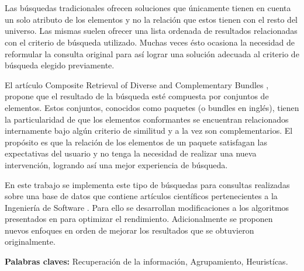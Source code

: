 \chapter*{\runtitulo}

\noindent Las búsquedas tradicionales ofrecen soluciones que únicamente tienen en cuenta un solo atributo de los elementos y no la relación que estos tienen con el resto del universo. Las mismas suelen ofrecer una lista ordenada de resultados relacionadas con el criterio de búsqueda utilizado. Muchas veces ésto ocasiona la necesidad de reformular la consulta original para así lograr una solución adecuada al criterio de búsqueda elegido previamente.

El artículo Composite Retrieval of Diverse and Complementary Bundles \cite{compositeRetrival}, propone que el resultado de la búsqueda esté compuesta por conjuntos de elementos. Estos conjuntos, conocidos como paquetes (o bundles en inglés), tienen la particularidad de que los elementos conformantes se encuentran relacionados internamente bajo algún criterio de similitud y a la vez son complementarios. El propósito es que la relación de los elementos de un paquete satisfagan las expectativas del usuario y no tenga la necesidad de realizar una nueva intervención, logrando así una mejor experiencia de búsqueda.

En este trabajo se implementa este tipo de búsquedas para consultas realizadas sobre una base de datos que contiene artículos científicos pertenecientes a la Ingeniería de Software \cite{dataDrive}. Para ello se desarrollan modificaciones a los algoritmos presentados en \cite{compositeRetrival} para optimizar el rendimiento. Adicionalmente se proponen nuevos enfoques en orden de mejorar los resultados que se obtuvieron originalmente.

\bigskip

\noindent\textbf{Palabras claves:} Recuperación de la información, Agrupamiento, Heuristícas.